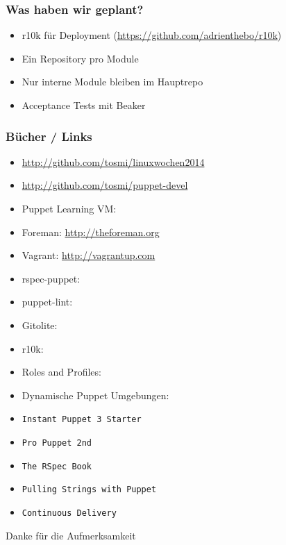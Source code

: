\documentclass{beamer}
\begin{document}
\begin{frame}
  \frametitle{Was haben wir geplant?}

  \begin{itemize}
  \item r10k für Deployment (\url{https://github.com/adrienthebo/r10k})
  \item Ein Repository pro Module
  \item Nur interne Module bleiben im Hauptrepo
  \item Acceptance Tests mit Beaker
  \end{itemize}
\end{frame}

\begin{frame}
  \frametitle{Bücher / Links}
\tiny
  \begin{itemize}
  \item \url{http://github.com/tosmi/linuxwochen2014}
  \item \url{http://github.com/tosmi/puppet-devel}
  \item Puppet Learning VM:
  \item Foreman: \url{http://theforeman.org}
  \item Vagrant: \url{http://vagrantup.com}
  \item rspec-puppet:
  \item puppet-lint:
  \item Gitolite:
  \item r10k:
  \item Roles and Profiles:
  \item Dynamische Puppet Umgebungen:
  \item \texttt{Instant Puppet 3 Starter}
  \item \texttt{Pro Puppet 2nd}
  \item \texttt{The RSpec Book}
  \item \texttt{Pulling Strings with Puppet}
  \item \texttt{Continuous Delivery}
  \end{itemize}
\end{frame}

\begin{frame}
  \huge{Danke für die Aufmerksamkeit}
\end{frame}
\end{document}
